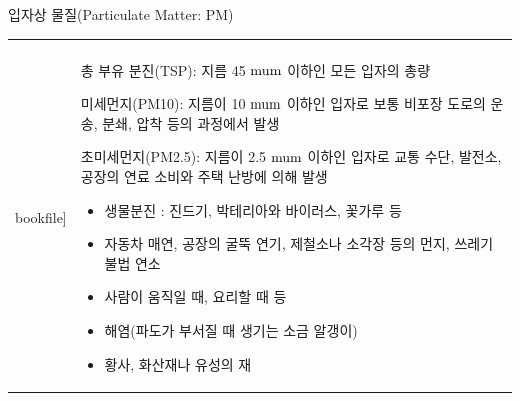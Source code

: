 \begin{frame}[t]{입자상 물질(Particulate Matter: PM)}
	\begin{tabular}{ll}
		\begin{minipage}[t]{0.4\textwidth}\scriptsize
			\begin{figure}[t]
				\texttt{[image: \\bookfile]}
			\end{figure}
		\end{minipage}	
		&
		\begin{minipage}[t]{0.55\textwidth} \scriptsize	
			총 부유 분진(TSP): 지름 45 $\rm{mu m}$ 이하인 모든 입자의 총량

			미세먼지(PM10): 지름이 10 $\rm{mu m}$ 이하인 입자로 보통 비포장 도로의 운송, 분쇄, 압착 등의 과정에서 발생

			초미세먼지(PM2.5): 지름이 2.5 $\rm{mu m}$ 이하인 입자로 교통 수단, 발전소, 공장의 연료 소비와 주택 난방에 의해 발생
	
		\begin{itemize}
				\item 생물분진 : 진드기, 박테리아와 바이러스, 꽃가루 등
				\item 자동차 매연, 공장의 굴뚝 연기, 제철소나 소각장 등의 먼지, 쓰레기 불법 연소
				\item 사람이 움직일 때, 요리할 때 등
				\item 해염(파도가 부서질 때 생기는 소금 알갱이)
				\item 황사, 화산재나 유성의 재
									
			\end{itemize}

		\end{minipage}
	\end{tabular}
\end{frame}



